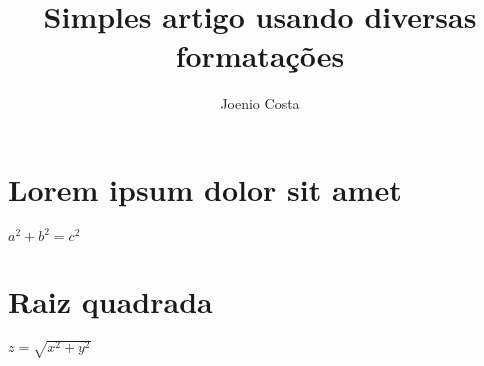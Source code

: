 \documentclass{article}
\begin{document}
\title{Simples artigo usando diversas formatações}

\author{Joenio Costa}

\maketitle

\section{Lorem ipsum dolor sit amet}

$a^2 + b^2 = c^2$

\section{Raiz quadrada}

$z=\sqrt{x^2+y^2}$
\end{document}
